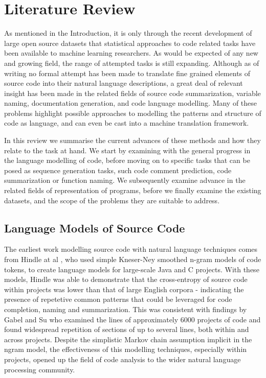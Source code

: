 \chapter{Literature Review}
\label{literature_review}


As mentioned in the Introduction, it is only through the recent development of large open source datasets that statistical approaches to code related tasks have been available to machine learning researchers. 
As would be expected of any new and growing field, the range of attempted tasks is still expanding. 
Although as of writing no formal attempt has been made to translate fine grained elements of source code into their natural language descriptions, a great deal of relevant insight has been made in the related fields of source code summarization, variable naming, documentation generation, and code language modelling. Many of these problems highlight possible approaches to modelling the patterns and structure of code as language, and can even be cast into a machine translation framework.  

In this review we summarise the current advances of these methods and how they relate to the task at hand.  We start by examining with the general progress in the language modelling of code, before moving on to specific tasks that can be posed as sequence generation tasks, such code comment prediction, code summarization or function naming. We subsequently examine advance in the related fields of representation of programs, before we finally examine the existing datasets, and the scope of the problems they are suitable to address. 

\section{Language Models of Source Code}

The earliest work modelling source code with natural language techniques comes from Hindle at al \cite{hindle_naturalness_nodate}, who used simple Kneser-Ney smoothed n-gram models of code tokens, to create language models for large-scale Java and C projects.
With these models, Hindle was able to demonstrate that the cross-entropy of source code within projects was lower than that of large English corpora - indicating the presence of repetetive common patterns that could be leveraged for code completion, naming and summarization.
This was consistent with findings by Gabel and Su \cite{gabel_study_2010} who examined the lines of approximately 6000 projects of code and found widespread repetition of sections of up to several lines, both within and across projects.
Despite the simplistic Markov chain assumption implicit in the ngram model, the effectiveness of this modelling techniques, especially within projects, opened up the field of code analysis to the wider natural language processing community.

